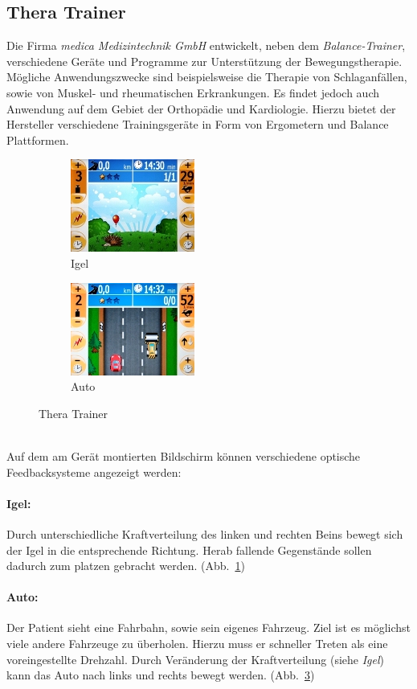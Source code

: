 \subsection{Thera Trainer}
Die Firma \textit{medica Medizintechnik GmbH} entwickelt, neben dem \textit{Balance-Trainer}, verschiedene Geräte und Programme zur Unterstützung der Bewegungstherapie. Mögliche Anwendungszwecke sind beispielsweise die Therapie von Schlaganfällen, sowie von Muskel- und rheumatischen Erkrankungen. Es findet jedoch auch Anwendung auf dem Gebiet der Orthopädie und Kardiologie. Hierzu bietet der Hersteller verschiedene Trainingsgeräte in Form von Ergometern und Balance Plattformen.\\
\begin{figure}[ht]
	\centering
	\begin{subfigure}{6 cm}
	\centering
			\includegraphics{gfx/recherche/Igel.jpg}
			\caption{Igel}
			\label{Igel}
	\end{subfigure}
	\begin{subfigure}{6 cm}
	\centering
			\includegraphics{gfx/recherche/Auto.jpg}  
			\caption{Auto}
			\label{Auto}
	\end{subfigure}
	\caption{Thera Trainer}
\end{figure}\\
Auf dem am Gerät montierten Bildschirm können verschiedene optische Feedbacksysteme angezeigt werden:

\paragraph{Igel:}\noindent
Durch unterschiedliche Kraftverteilung des linken und rechten Beins bewegt sich der Igel in die entsprechende Richtung. Herab fallende Gegenstände sollen dadurch zum platzen gebracht werden. (Abb.~\ref{Igel})

\paragraph{Auto:}\noindent
Der Patient sieht eine Fahrbahn, sowie sein eigenes Fahrzeug. Ziel ist es möglichst viele andere Fahrzeuge zu überholen. Hierzu muss er schneller Treten als eine voreingestellte Drehzahl. Durch Veränderung der Kraftverteilung (siehe \textit{Igel}) kann das Auto nach links und rechts bewegt werden. (Abb.~\ref{Auto})

